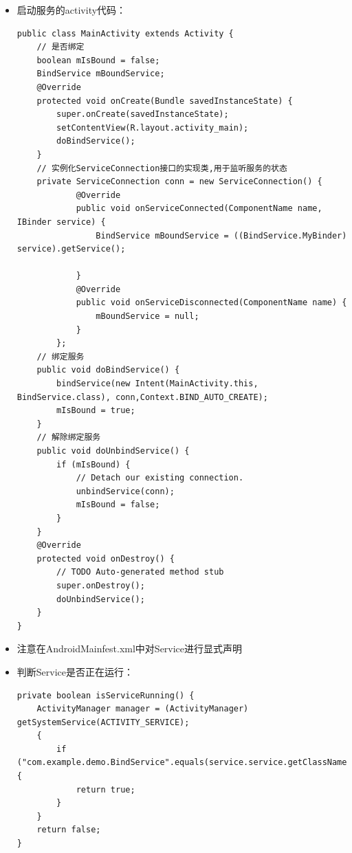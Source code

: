 \documentclass[9pt, b5paper]{article}
\begin{document}
\begin{itemize}
\begin{verbatim}
     // MyBinder提供方法返回BindService实例。
    public class MyBinder extends Binder{
        public BindService getService(){
            return BindService.this;
        }
    }
    @Override
    public boolean onUnbind(Intent intent) {
        // TODO Auto-generated method stub
        return super.onUnbind(intent);
    }
}
\end{verbatim}
\item 启动服务的activity代码：
\begin{verbatim}
public class MainActivity extends Activity {
    // 是否绑定 
    boolean mIsBound = false; 
    BindService mBoundService;
    @Override
    protected void onCreate(Bundle savedInstanceState) {
        super.onCreate(savedInstanceState);
        setContentView(R.layout.activity_main);
        doBindService();
    }
    // 实例化ServiceConnection接口的实现类,用于监听服务的状态
    private ServiceConnection conn = new ServiceConnection() {  
            @Override  
            public void onServiceConnected(ComponentName name, IBinder service) {  
                BindService mBoundService = ((BindService.MyBinder) service).getService();  
            
            }  
            @Override  
            public void onServiceDisconnected(ComponentName name) {  
                mBoundService = null;  
            }  
        }; 
    // 绑定服务 
    public void doBindService() {  
        bindService(new Intent(MainActivity.this, BindService.class), conn,Context.BIND_AUTO_CREATE);  
        mIsBound = true;  
    }  
    // 解除绑定服务
    public void doUnbindService() {  
        if (mIsBound) {  
            // Detach our existing connection.  
            unbindService(conn);  
            mIsBound = false;  
        }  
    } 
    @Override
    protected void onDestroy() {
        // TODO Auto-generated method stub
        super.onDestroy();
        doUnbindService();
    }
}
\end{verbatim}
\item 注意在AndroidMainfest.xml中对Service进行显式声明
\item 判断Service是否正在运行：
\begin{verbatim}
private boolean isServiceRunning() {
    ActivityManager manager = (ActivityManager) getSystemService(ACTIVITY_SERVICE);
    {
        if ("com.example.demo.BindService".equals(service.service.getClassName())) {
            return true;
        }
    }
    return false;
}
\end{verbatim}
\end{itemize}
\end{document}
